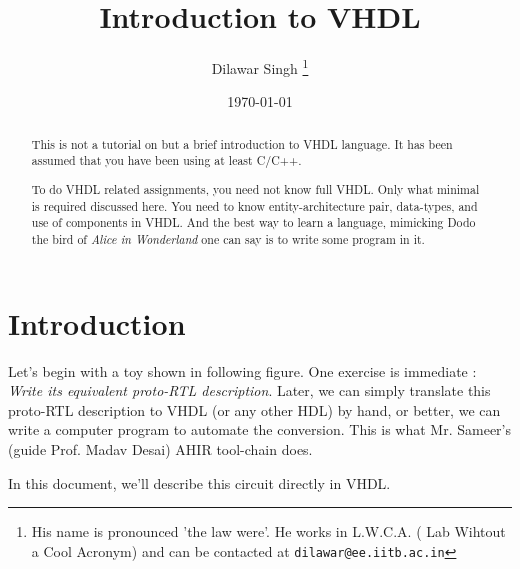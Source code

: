 \documentclass[a4paper,10pt]{article}
\title{Introduction to VHDL}
\author{Dilawar Singh \footnote{His name is pronounced 'the law were'. He works in L.W.C.A. ( Lab Wihtout a Cool Acronym) and
can be contacted at \texttt{dilawar@ee.iitb.ac.in}}}
\date{\today}
\begin{document}
\maketitle

\begin{abstract}
  
  This is not a tutorial on but a brief introduction to VHDL language. It has
  been assumed that you have been using at least C/C++. 
  
  To do VHDL related assignments, you need not know full VHDL.  Only what 
  minimal is required discussed here. You need to know entity-architecture
  pair, data-types, and use of components in VHDL. And the best way to learn a
  language, mimicking Dodo the bird of \emph{Alice in Wonderland} one can say is
  to write some program in it. 

\end{abstract}

\section{Introduction}
  
 Let's begin with a toy shown in following figure. One exercise is immediate :
 \emph{Write its equivalent proto-RTL description}. Later, we can simply
 translate this proto-RTL description to VHDL (or any other HDL) by hand, or
 better, we can write a computer program to automate the conversion. This is
 what Mr. Sameer's (guide Prof. Madav Desai) AHIR tool-chain does.

 In this document, we'll describe this circuit directly in VHDL.
 
\end{document}
